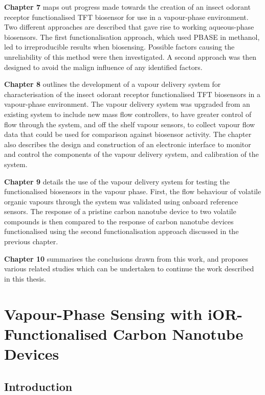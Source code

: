 \documentclass[
  a4paper,
]{scrbook}
\begin{document}
\textbf{Chapter 7} maps out progress made towards the creation of an
insect odorant receptor functionalised TFT biosensor for use in a
vapour-phase environment. Two different approaches are described that
gave rise to working aqueous-phase biosensors. The first
functionalisation approach, which used PBASE in methanol, led to
irreproducible results when biosensing. Possible factors causing the
unreliability of this method were then investigated. A second approach
was then designed to avoid the malign influence of any identified
factors.

\textbf{Chapter 8} outlines the development of a vapour delivery system
for characterisation of the insect odorant receptor functionalised TFT
biosensors in a vapour-phase environment. The vapour delivery system was
upgraded from an existing system to include new mass flow controllers,
to have greater control of flow through the system, and off the shelf
vapour sensors, to collect vapour flow data that could be used for
comparison against biosensor activity. The chapter also describes the
design and construction of an electronic interface to monitor and
control the components of the vapour delivery system, and calibration of
the system.

\textbf{Chapter 9} details the use of the vapour delivery system for
testing the functionalised biosensors in the vapour phase. First, the
flow behaviour of volatile organic vapours through the system was
validated using onboard reference sensors. The response of a pristine
carbon nanotube device to two volatile compounds is then compared to the
response of carbon nanotube devices functionalised using the second
functionalisation approach discussed in the previous chapter.

\textbf{Chapter 10} summarises the conclusions drawn from this work, and
proposes various related studies which can be undertaken to continue the
work described in this thesis.


\hypertarget{sec-vapour-biosensing-iORs}{%
\chapter{Vapour-Phase Sensing with iOR-Functionalised Carbon Nanotube
Devices}\label{sec-vapour-biosensing-iORs}}

\hypertarget{introduction-1}{%
\section{Introduction}\label{introduction-1}}
\end{document}
